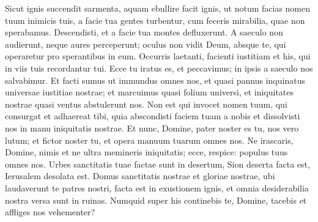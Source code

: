 \begin{biblechapter}  
\verse Sicut ignis succendit sarmenta, aquam ebullire facit ignis, ut notum facias nomen tuum inimicis tuis, a facie tua gentes turbentur, 
\verse cum feceris mirabilia, quae non sperabamus. Descendisti, et a facie tua montes defluxerunt. 
\verse A saeculo non audierunt, neque aures perceperunt; oculus non vidit Deum, absque te, qui operaretur pro sperantibus in eum. 
\verse Occurris laetanti, facienti iustitiam et his, qui in viis tuis recordantur tui. Ecce tu iratus es, et peccavimus; in ipsis a saeculo nos salvabimur. 
\verse Et facti sumus ut immundus omnes nos, et quasi pannus inquinatus universae iustitiae nostrae; et marcuimus quasi folium universi, et iniquitates nostrae quasi ventus abstulerunt nos. 
\verse Non est qui invocet nomen tuum, qui consurgat et adhaereat tibi, quia abscondisti faciem tuam a nobis et dissolvisti nos in manu iniquitatis nostrae. 
\verse Et nunc, Domine, pater noster es tu, nos vero lutum; et fictor noster tu, et opera manuum tuarum omnes nos. 
\verse Ne irascaris, Domine, nimis et ne ultra memineris iniquitatis; ecce, respice: populus tuus omnes nos. 
\verse Urbes sanctitatis tuae factae sunt in desertum, Sion deserta facta est, Ierusalem desolata est. 
\verse Domus sanctitatis nostrae et gloriae nostrae, ubi laudaverunt te patres nostri, facta est in exustionem ignis, et omnia desiderabilia nostra versa sunt in ruinas. 
\verse Numquid super his continebis te, Domine, tacebis et affliges nos vehementer? 
\end{biblechapter}

